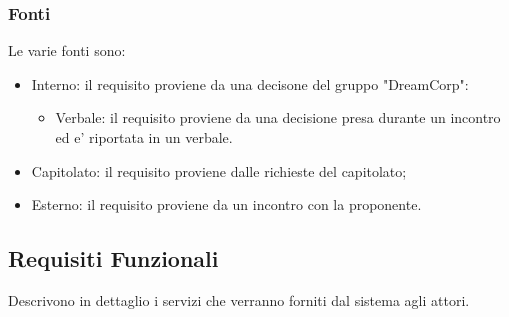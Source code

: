     
    \subsubsection{Fonti}
    Le varie fonti sono:
        \begin{itemize}
            \item Interno: il requisito proviene da una decisone del gruppo "DreamCorp":
                \begin{itemize}
                    \item Verbale: il requisito proviene da una decisione presa durante un incontro ed e' riportata in un verbale.
                \end{itemize}
            \item Capitolato: il requisito proviene dalle richieste del capitolato;
            \item Esterno: il requisito proviene da un incontro con la proponente.
        \end{itemize}
    
		\subsection{Requisiti Funzionali}			
        Descrivono in dettaglio i servizi che verranno forniti dal sistema agli attori.
        
